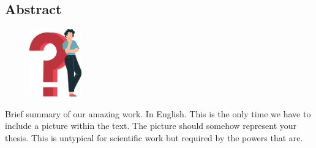 \begin{spacing}{1}
    \chapter*{Abstract}
\end{spacing}
\begin{figure}
    \begin{center}
      \includegraphics[width=0.2\textwidth]{pics/question_mark.png}
    \end{center}
\end{figure}
Brief summary of our amazing work. In English.
This is the only time we have to include a picture within the text.
The picture should somehow represent your thesis.
This is untypical for scientific work but required by the powers that are.
\lipsum[6]